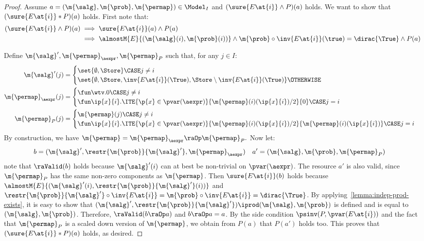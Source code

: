 \begin{proof}
  Assume $a = (\m{\salg}, \m{\prob}, \m{\permap}) \in \Model_I$ and
  $(\sure{E\at{i}} \land P)(a)$ holds.
  We want to show that
  $(\sure{E\at{i}} \ast P)(a)$ holds.
  First note that:
  \begin{align*}
    (\sure{E\at{i}} \land P)(a)
    & \implies \sure{E\at{i}}(a) \land P(a) \\
    & \implies \almostM{E}{(\m{\salg}(i), \m{\prob}(i))}
    \land \m{\prob} \circ \inv{E\at{i}}(\true) = \dirac{\True}
    \land P(a)
  \end{align*}

  Define $\m{\salg}', \m{\permap}_{\aexpr}, \m{\permap}_{P}$ such that,
  for any $j \in I$:
  \begin{align*}
    \m{\salg}'(j) &=
    \begin{cases}
      \set{\emptyset, \Store} \CASE j \neq i\\
      \set{\emptyset, \Store, \inv{E\at{i}}(\True), \Store \setminus
      \inv{E\at{i}}(\True)} \OTHERWISE
    \end{cases}
    \\
    \m{\permap}_{\aexpr}(j) &=
    \begin{cases}
      \fun \wtv.0 \CASE j \ne i \\
      \fun \ip{x}{i}.
        \ITE{\p{x} \in \pvar(\aexpr)}{\m{\permap}(i)(\ip{x}{i})/2}{0}
    \CASE j = i
    \end{cases}
    \\
    \m{\permap}_{P}(j) &=
    \begin{cases}
      \m{\permap}(j) \CASE j \ne i \\
      \fun \ip{x}{i}.
        \ITE{\p{x} \in \pvar(\aexpr)}{\m{\permap}(i)(\ip{x}{i})/2}{\m{\permap}(i)(\ip{x}{i})}
    \CASE j = i
    \end{cases}
  \end{align*}
  By construction, we have
  $
    \m{\permap} = \m{\permap}_{\aexpr} \raOp \m{\permap}_{P}.
  $
  Now let:
  \begin{align*}
    b &= (\m{\salg}', \restr{\m{\prob}}{\m{\salg}'}, \m{\permap}_{\aexpr})
    &
    a' &= (\m{\salg}, \m{\prob}, \m{\permap}_{P})
  \end{align*}
  note that $\raValid(b)$ holds because $\m{\salg}'(i)$ can at best be non-trivial on $\pvar(\aexpr)$.
  The resource $a'$ is also valid, since $\m{\permap}_{P}$ has the same non-zero components as $\m{\permap}$.
  Then
  $\sure{E\at{i}}(b)$ holds because
  $\almostM{E}{( \m{\salg}'(i), \restr{\m{\prob}}{\m{\salg}'}(i) )}$
  and $\restr{\m{\prob}}{\m{\salg}'} \circ \inv{E\at{i}}
  = \m{\prob} \circ \inv{E\at{i}} = \dirac{\True}$.
  By applying~\cref{lemma:indep-prod-exists}, it is easy to show that
  $(\m{\salg}', \restr{\m{\prob}}{\m{\salg}'}) \iprod (\m{\salg}, \m{\prob})$
  is defined and is equal to $(\m{\salg}, \m{\prob})$.
  Therefore,
  $\raValid(b \raOp a)$ and $b \raOp a = a$.
  By the side condition $\psinv(P, \pvar(E\at{i}))$ and the fact that
  $\m{\permap}_{P}$ is a scaled down version of $\m{\permap}$,
  we obtain from $P(a)$ that $P(a')$ holds too.
  This proves that
  $(\sure{E\at{i}} \ast P)(a)$ holds, as desired.
\end{proof}
